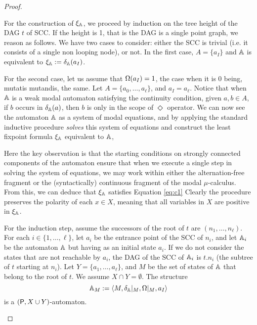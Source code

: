 \begin{proof}
\begin{pfclaim}
For the construction of $\xi_\mathbb{A}$, we proceed by induction on the tree height of the DAG $t$ of SCC. If the height is 1, that is the DAG is a single point graph, we reason as follows.
 We have two cases to consider: either the SCC is trivial (i.e. it consists of a single non looping node), or not.
In the first case, $A=\{a_I\}$ and $\mathbb{A}$ is equivalent to $\xi_\mathbb{A}:=\delta_\mathbb{A}(a_I)$.

For the second case, let us assume that $\Omega(a_I)=1$, the case when it is $0$ being, mutatis mutandis, the same.
Let $A=\{a_0, \dots, a_\ell\}$, and $a_I=a_\ell$.
Notice that when $\mathbb{A}$ is a weak modal automaton satisfying the continuity condition, given $a,b \in A$, if $b$ occurs in $\delta_\mathbb{A}(a)$, then $b$ is only in the scope of $\Diamond$ operator. 
We can now see the automaton $\mathbb{A}$
as a system of modal equations, and by applying the standard inductive procedure \emph{solves} this system of equations and
construct the least fixpoint formula $\xi_\mathbb{A}$ equivalent to $\mathbb{A}$, 

Here the key observation is that the starting conditions on
strongly connected components of the automaton ensure that when we execute
a single step in solving the system of equations, we 
may work within either the alternation-free fragment or the
(syntactically) continuous fragment of the modal $\mu$-calculus.
From this, we can deduce that $\xi_\mathbb{A}$ satisfies Equation \ref{eq:c1}
 Clearly the procedure preserves the polarity of each $x \in X$, meaning that all variables in $X$ are positive in $\xi_\mathbb{A}$.


For the induction step, assume the successors of the root of $t$ are $(n_1, \dots, n_\ell)$. For each $i \in \{1,\dots,\ell\}$, let $a_i$ be the entrance point of the SCC of $n_i$, and let $\mathbb{A}_{i}$ be the automaton $\mathbb{A}$ but having as an initial state $a_i$. If we do not consider the states that are not reachable by $a_i$, the DAG of the SCC of $\mathbb{A}_{i}$ is $t.{n_i}$ (the subtree of $t$ starting at $n_i$).
Let $Y=\{a_1, \dots, a_\ell\}$, and $M$ be the set of states of $\mathbb{A}$ that belong to the root of $t$. We assume $X \cap Y = \emptyset$. The structure
\[
\aut_M := \tup{M, \delta_\aut|_{M}, \pmap|_{M}, a_I}
\] is a $(\mathsf{P}, X \cup Y)$-automaton.


\end{pfclaim}
\end{proof}
